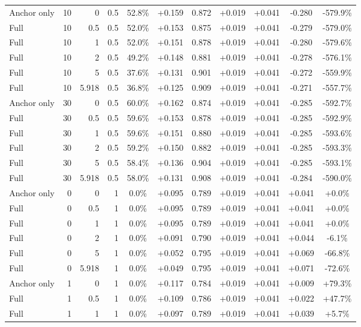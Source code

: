 \begin{table}[htbp]
\begin{tabular}{lrrrccccccc}
Anchor only & 10 & 0 & 0.5 & 52.8\% & +0.159 & 0.872 & +0.019 & +0.041 & -0.280 & -579.9\% \\
Full & 10 & 0.5 & 0.5 & 52.0\% & +0.153 & 0.875 & +0.019 & +0.041 & -0.279 & -579.0\% \\
Full & 10 & 1 & 0.5 & 52.0\% & +0.151 & 0.878 & +0.019 & +0.041 & -0.280 & -579.6\% \\
Full & 10 & 2 & 0.5 & 49.2\% & +0.148 & 0.881 & +0.019 & +0.041 & -0.278 & -576.1\% \\
Full & 10 & 5 & 0.5 & 37.6\% & +0.131 & 0.901 & +0.019 & +0.041 & -0.272 & -559.9\% \\
Full & 10 & 5.918 & 0.5 & 36.8\% & +0.125 & 0.909 & +0.019 & +0.041 & -0.271 & -557.7\% \\
Anchor only & 30 & 0 & 0.5 & 60.0\% & +0.162 & 0.874 & +0.019 & +0.041 & -0.285 & -592.7\% \\
Full & 30 & 0.5 & 0.5 & 59.6\% & +0.153 & 0.878 & +0.019 & +0.041 & -0.285 & -592.9\% \\
Full & 30 & 1 & 0.5 & 59.6\% & +0.151 & 0.880 & +0.019 & +0.041 & -0.285 & -593.6\% \\
Full & 30 & 2 & 0.5 & 59.2\% & +0.150 & 0.882 & +0.019 & +0.041 & -0.285 & -593.3\% \\
Full & 30 & 5 & 0.5 & 58.4\% & +0.136 & 0.904 & +0.019 & +0.041 & -0.285 & -593.1\% \\
Full & 30 & 5.918 & 0.5 & 58.0\% & +0.131 & 0.908 & +0.019 & +0.041 & -0.284 & -590.0\% \\
Anchor only & 0 & 0 & 1 & 0.0\% & +0.095 & 0.789 & +0.019 & +0.041 & +0.041 & +0.0\% \\
Full & 0 & 0.5 & 1 & 0.0\% & +0.095 & 0.789 & +0.019 & +0.041 & +0.041 & +0.0\% \\
Full & 0 & 1 & 1 & 0.0\% & +0.095 & 0.789 & +0.019 & +0.041 & +0.041 & +0.0\% \\
Full & 0 & 2 & 1 & 0.0\% & +0.091 & 0.790 & +0.019 & +0.041 & +0.044 & -6.1\% \\
Full & 0 & 5 & 1 & 0.0\% & +0.052 & 0.795 & +0.019 & +0.041 & +0.069 & -66.8\% \\
Full & 0 & 5.918 & 1 & 0.0\% & +0.049 & 0.795 & +0.019 & +0.041 & +0.071 & -72.6\% \\
Anchor only & 1 & 0 & 1 & 0.0\% & +0.117 & 0.784 & +0.019 & +0.041 & +0.009 & +79.3\% \\
Full & 1 & 0.5 & 1 & 0.0\% & +0.109 & 0.786 & +0.019 & +0.041 & +0.022 & +47.7\% \\
Full & 1 & 1 & 1 & 0.0\% & +0.097 & 0.789 & +0.019 & +0.041 & +0.039 & +5.7\% \\

\end{tabular}
\end{table}

